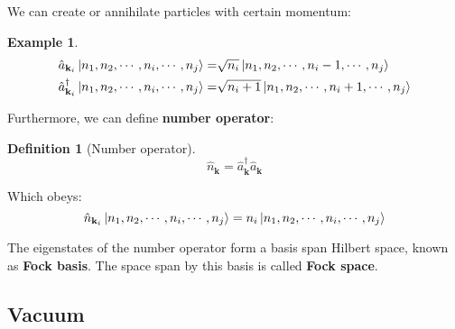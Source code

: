 \documentclass[12pt]{article}
\numberwithin{equation}{section}
\theoremstyle{1style}
\newtheorem{definition}[equation]{Definition}
\newtheorem{example}[equation]{Example}
\newcommand{\tbf}[1]{\textbf{#1}}
\begin{document}
We can create or annihilate particles with certain momentum:
\begin{example}
  \begin{align*}
    \hat{a}_{\mathbf{k}_i}\ket{n_1,n_2,\cdots,n_i,\cdots,n_j}=           & \sqrt{n_i}\ket{n_1,n_2,\cdots,n_i-1,\cdots,n_j}   \\
    \hat{a}^{\dagger}_{\mathbf{k}_i}\ket{n_1,n_2,\cdots,n_i,\cdots,n_j}= & \sqrt{n_i+1}\ket{n_1,n_2,\cdots,n_i+1,\cdots,n_j}
  \end{align*}
\end{example}

Furthermore, we can define \tbf{number operator}:
\begin{definition}[Number operator]
  \[\hat{n}_{\mathbf{k}}=\hat{a}^\dagger_{\mathbf{k}}\hat{a}_{\mathbf{k}}\]
\end{definition}

Which obeys:
\begin{equation}
  \hat{n}_{\mathbf{k}_i}\ket{n_1,n_2,\cdots,n_i,\cdots,n_j}=    n_i\ket{n_1,n_2,\cdots,n_i,\cdots,n_j}
\end{equation}

The eigenstates of the number operator form a basis span Hilbert space, known as \tbf{Fock basis}.
The space span by this basis is called \tbf{Fock space}.

\subsection{Vacuum}
\end{document}
